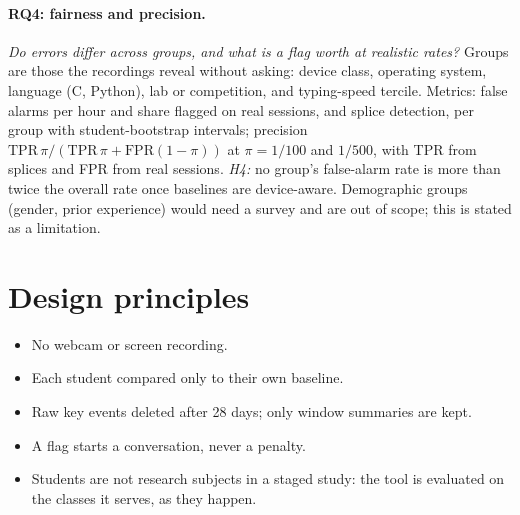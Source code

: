 \paragraph{RQ4: fairness and precision.} \emph{Do errors differ across groups, and
what is a flag worth at realistic rates?} Groups are those the recordings reveal
without asking: device class, operating system, language (C, Python), lab or
competition, and typing-speed tercile. Metrics: false alarms per hour and share
flagged on real sessions, and splice detection, per group with student-bootstrap
intervals; precision $\mathrm{TPR}\,\pi / (\mathrm{TPR}\,\pi + \mathrm{FPR}(1-\pi))$
at $\pi = 1/100$ and $1/500$, with TPR from splices and FPR from real sessions.
\emph{H4:} no group's false-alarm rate is more than twice the overall rate once
baselines are device-aware. Demographic groups (gender, prior experience) would
need a survey and are out of scope; this is stated as a limitation.

\section{Design principles}
\begin{itemize}
  \item No webcam or screen recording.
  \item Each student compared only to their own baseline.
  \item Raw key events deleted after 28 days; only window summaries are kept.
  \item A flag starts a conversation, never a penalty.
  \item Students are not research subjects in a staged study: the tool is
    evaluated on the classes it serves, as they happen.
\end{itemize}
